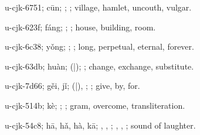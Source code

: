 \begin{multicols}{2}
{\cjkgGlue{}u-cjk-6751; cūn; \cjkgGlue{}; \cjkgGlue{}; village, hamlet, uncouth, vulgar.

\cjkgGlue{}u-cjk-623f; fáng; \cjkgGlue{}; \cjkgGlue{}; house, building, room.

\cjkgGlue{}u-cjk-6c38; yǒng; \cjkgGlue{}\cjkgGlue{}\cjkgGlue{}; \cjkgGlue{}; long, perpetual, eternal, forever.

\cjkgGlue{}u-cjk-63db; huàn; \cjkgGlue{}\cjkgGlue{}(\cjkgGlue{}|\cjkgGlue{}); \cjkgGlue{}; change, exchange, substitute.

\cjkgGlue{}u-cjk-7d66; gěi, jǐ; \cjkgGlue{}\cjkgGlue{}(\cjkgGlue{}|\cjkgGlue{}), \cjkgGlue{}\cjkgGlue{}\cjkgGlue{}; \cjkgGlue{}; give, by, for.

\cjkgGlue{}u-cjk-514b; kè; \cjkgGlue{}\cjkgGlue{}\cjkgGlue{}; \cjkgGlue{}; gram, overcome, transliteration.

\cjkgGlue{}u-cjk-54c8; hā, hǎ, hà, kā; \cjkgGlue{}, \cjkgGlue{}, \cjkgGlue{}; \cjkgGlue{}, \cjkgGlue{}, \cjkgGlue{}; sound of laughter.

}
\end{multicols}
